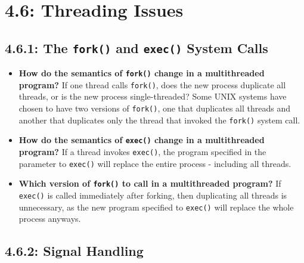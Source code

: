 \documentclass[12pt]{article}
\begin{document}
\section*{4.6: Threading Issues}

\subsection*{4.6.1: The \texttt{fork()} and \texttt{exec()} System Calls}

\begin{itemize}
    \item \textbf{How do the semantics of \texttt{fork()} change in a multithreaded program?} If one thread calls \texttt{fork()}, does the new process duplicate all threads, or is the new process single-threaded? Some UNIX systems have chosen to have two versions of \texttt{fork()}, one that duplicates all threads and another that duplicates only the thread that invoked the \texttt{fork()} system call.
    \item \textbf{How do the semantics of \texttt{exec()} change in a multithreaded program?} If a thread invokes \texttt{exec()}, the program specified in the parameter to \texttt{exec()} will replace the entire process - including all threads.
    \item \textbf{Which version of \texttt{fork()} to call in a multithreaded program?} If \texttt{exec()} is called immediately after forking, then duplicating all threads is unnecessary, as the new program specified to \texttt{exec()} will replace the whole process anyways.
\end{itemize}

\subsection*{4.6.2: Signal Handling}
\end{document}
